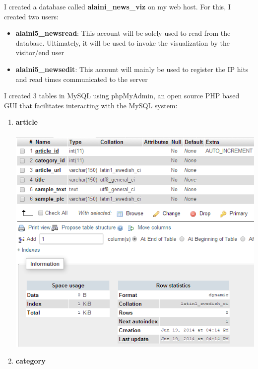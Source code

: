 \documentclass[12pt]{article}
\begin{document}
I created a database called \textbf{alaini\_news\_viz} on my web host. For this, I created two users:\\
\begin{itemize}
\item \textbf{alaini5\_newsread}: This account will be solely used to read from the database. Ultimately, it will be used to invoke the visualization by the visitor/end user
\item \textbf{alaini5\_newsedit}: This account will mainly be used to register the IP hits and read times communicated to the server
\end{itemize}

I created 3 tables in MySQL using phpMyAdmin, an open source PHP based GUI that facilitates interacting with the MySQL system:
\begin{enumerate}
\item{\textbf{article}}\\ \\
\includegraphics[scale=0.6]{img/article_table}
\item{\textbf{category}}\\ \\

\end{enumerate}
\end{document}
